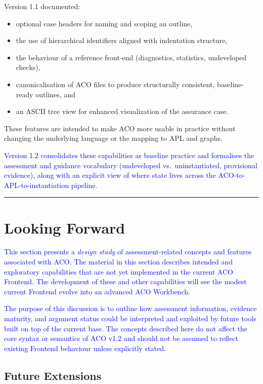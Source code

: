 \documentclass[11pt]{article}
\begin{document}
Version 1.1 documented:
\begin{itemize}[leftmargin=2em]
  \item optional case headers for naming and scoping an outline,
  \item the use of hierarchical identifiers aligned with indentation structure,
  \item the behaviour of a reference front-end (diagnostics, statistics, undeveloped checks),
  \item canonicalisation of ACO files to produce structurally consistent, baseline-ready outlines, and
  \item an ASCII tree view for enhanced visualization of the assurance case.
\end{itemize}
These features are intended to make ACO more usable in practice without changing the underlying language or the mapping to APL and graphs.

\textcolor{blue}{Version 1.2 consolidates these capabilities as baseline practice and formalises the assessment and guidance vocabulary (undeveloped vs.\ uninstantiated, provisional evidence), along with an explicit view of where state lives across the ACO-to-APL-to-instantiation pipeline.}

\bigskip
\hrule
\bigskip

\section{Looking Forward}

\textcolor{blue}{This section presents a \emph{design study} of assessment-related concepts and features associated with ACO. The material in this section describes intended and
exploratory capabilities that are not yet implemented in the current ACO Frontend.
The development of these and other capabilities will see the modest current Frontend evolve into an advanced ACO Workbench.}

\textcolor{blue}{The purpose of this discussion is to outline how assessment information, evidence
maturity, and argument status could be interpreted and exploited by future tools
built on top of the current base. The concepts described here do not affect the core
syntax or semantics of ACO v1.2 and should not be assumed to reflect existing
Frontend behaviour unless explicitly stated.}

\subsection{Future Extensions}
\label{sec:future-extensions}
\end{document}
